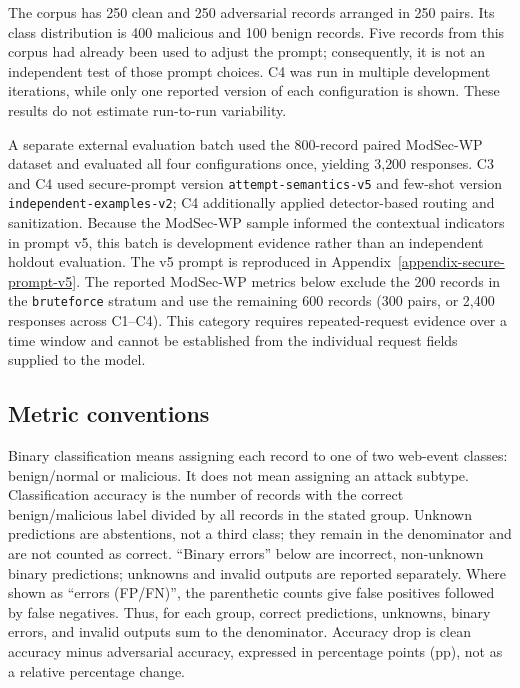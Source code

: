 The corpus has 250 clean and 250 adversarial records arranged in 250
pairs. Its class distribution is 400 malicious and 100 benign records.
Five records from this corpus had already been used to adjust the
prompt; consequently, it is not an independent test of those prompt
choices. C4 was run in multiple development iterations, while only one
reported version of each configuration is shown. These results do not
estimate run-to-run variability.

A separate external evaluation batch used the 800-record paired
ModSec-WP dataset and evaluated all four configurations once, yielding
3{,}200 responses. C3 and C4 used secure-prompt version
\texttt{attempt-\allowbreak{}semantics-\allowbreak{}v5} and few-shot
version \texttt{independent-\allowbreak{}examples-\allowbreak{}v2}; C4 additionally
applied detector-based routing and sanitization. Because the ModSec-WP
sample informed the contextual indicators in prompt v5, this batch is
development evidence rather than an independent holdout evaluation. The
v5 prompt is reproduced in Appendix~\ref{appendix-secure-prompt-v5}.
The reported ModSec-WP metrics below exclude the 200 records in the
\texttt{bruteforce} stratum and use the remaining 600 records (300
pairs, or 2{,}400 responses across C1--C4). This category requires
repeated-request evidence over a time window and cannot be established
from the individual request fields supplied to the model.

\subsection{Metric conventions}\label{evaluation-metric-conventions}

Binary classification means assigning each record to one of two
web-event classes: benign/normal or malicious. It does not mean
assigning an attack subtype. Classification accuracy is the number of
records with the correct benign/malicious label divided by all records
in the stated group. Unknown predictions are abstentions, not a third
class; they remain in the denominator and are not counted as correct.
``Binary errors'' below are incorrect,
non-unknown binary predictions; unknowns and invalid outputs are
reported separately. Where shown as ``errors (FP/FN)'', the parenthetic
counts give false positives followed by false negatives. Thus, for each
group, correct predictions, unknowns, binary errors, and invalid
outputs sum to the denominator.
Accuracy drop is clean accuracy minus adversarial accuracy, expressed
in percentage points (pp), not as a relative percentage change.

